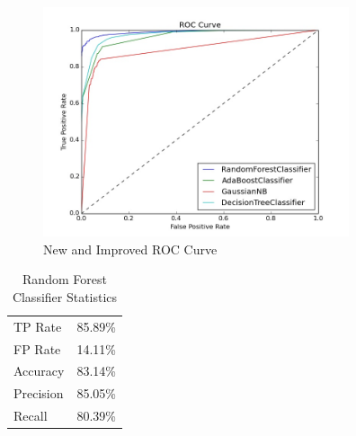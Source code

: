 \documentclass{acm_proc_article-sp}
\begin{document}
\begin{figure}[ht!]
\centering
\includegraphics[width=90mm]{images/20160417_new_and_improved_ROC_jpeg.jpg}
\caption{New and Improved ROC Curve \label{overflow}}
\end{figure}


\begin{table}[h]
\centering
\begin{tabular}{ |p{3.5cm}||p{2cm}|  }
 \hline
 TP Rate& 85.89\%\\
 FP Rate& 14.11\%\\
 Accuracy & 83.14\%\\
 Precision & 85.05\%\\
 Recall& 80.39\%\\
\hline
\end{tabular}
\vspace{2mm}
\caption{Random Forest Classifier Statistics}
\label{table:2}
\end{table}
\end{document}

